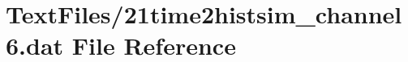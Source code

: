 \hypertarget{21time2histsim__channel6_8dat}{}\section{Text\+Files/21time2histsim\+\_\+channel6.dat File Reference}
\label{21time2histsim__channel6_8dat}
